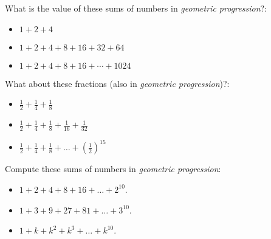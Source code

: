 \begin{exercise}\label{ex:powers-of-two}
What is the value of these sums of numbers in \emph{geometric progression}?:
\begin{itemize}
    \item $1+2+4$
    \item $1+2+4+8+16+32+64$
    \item $1+2+4+8+16+\cdots+1024$
\end{itemize}
\end{exercise}

\begin{exercise}
What about these fractions (also in \emph{geometric progression})?:
\begin{itemize}
    \item $\frac{1}{2}+\frac{1}{4}+\frac{1}{8}$
    \item $\frac{1}{2}+\frac{1}{4}+\frac{1}{8}+\frac{1}{16}+\frac{1}{32}$
    \item $\frac{1}{2}+\frac{1}{4}+\frac{1}{8}+\dots +\left(\frac{1}{2}\right)^{15}$    
    \end{itemize}
\end{exercise}
\tutpagebreak


\begin{exercise}
Compute these sums of numbers in \emph{geometric progression}:
\begin{itemize}
    \item $1+2+4+8+16+\dots +2^{10}$.
    \item $1+3+9+27+81+\dots +3^{10}$.
    \item $1+k+k^2+k^3+\dots +k^{10}$.
    \end{itemize}
\end{exercise}

